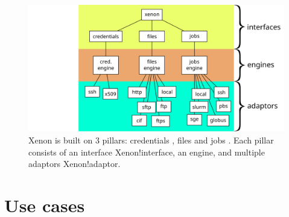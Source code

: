 \documentclass[12pt, a4paper, twoside, openany, titlepage]{book}
\begin{document}
\begin{figure}[ht]
\centering
\includegraphics[width=1.0\columnwidth]{images/xenon-design}
\caption{\label{fig:xenon-design} Xenon is built on 3 pillars: credentials
, files and jobs
. Each pillar consists of an interface\index
{Xenon!interface}, an engine, and multiple adaptors\index
{Xenon!adaptor}.}
\end{figure}


\section{Use cases}
\end{document}
